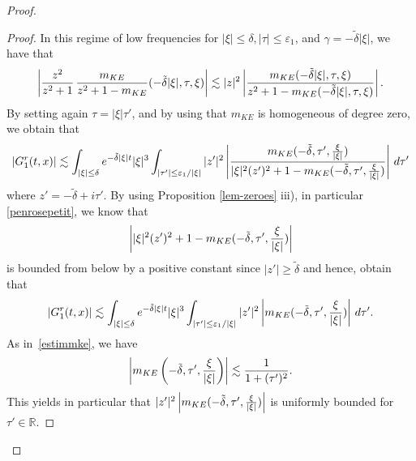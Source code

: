 \documentclass[11pt]{amsart}
\numberwithin{equation}{section}
\newcommand{\eps}{\varepsilon}
\begin{document}
\begin{proof}
   
   \begin{proof}
    In this regime of low frequencies for $ |\xi| \leq \delta, | \tau | \leq \eps_{1}$, and $\gamma= -\tilde \delta |\xi|$, we have  that
     $$\left| { z^2 \over z^2 + 1} \, { m_{KE} \over z^2 + 1 - m_{KE}}(- \tilde \delta | \xi|, \tau,  \xi) \right|
      \lesssim |z|^2  \left | {m_{KE}  (- \tilde \delta | \xi|, \tau , \xi) \over z^2 + 1 - m_{KE}(  -\tilde \delta | \xi|, \tau,  \xi)} \right| .$$
   By setting again $\tau = |\xi| \tau'$, and by using  that $m_{KE}$ is homogeneous of degree zero,  we obtain that
   $$ |G^r_{1}(t,x)| \lesssim   \int_{| \xi | \leq \delta}  e^{ - \tilde \delta | \xi | t} |\xi|^3   \int_{|\tau' | \leq \eps_{1}/|\xi|} 
    |z'|^2  \left| {m_{KE}  ( - \tilde \delta, \tau' , {\xi \over |\xi|}) \over  |\xi|^2 (z')^2  +  1 - m_{KE}(  -\tilde \delta , \tau ',  {\xi \over |\xi|})}  \right|\, d\tau'$$
    where $z' = -\tilde \delta + i \tau'.$
By using Proposition \ref{lem-zeroes} iii), in particular \eqref{penrosepetit}, we know that
$$ \left| |\xi|^2 (z')^2  +  1 - m_{KE}(  -\tilde \delta , \tau ',  {\xi \over |\xi|}) \right|$$
 is bounded from below by a positive constant  since $|z'| \geq  \tilde \delta$
and hence, obtain that
$$ |G^r_{1}(t,x)| \lesssim   \int_{| \xi | \leq \delta}  e^{ - \tilde \delta | \xi | t} |\xi|^3   \int_{|\tau' | \leq \eps_{1}/|\xi|} 
   |z'|^2  \left| m_{KE}  ( - \tilde \delta, \tau' , {\xi \over |\xi|})   \right|\, d\tau'.$$
  As in~\eqref{estimmke}, we have
   $$  \left|m_{KE}  \left( - \tilde \delta, \tau' , {\xi \over |\xi|} \right) \right|\lesssim { 1 \over 1+ (\tau')^2}.$$
   This yields in particular that 
   $ |z'|^2  \left| m_{KE}  ( - \tilde \delta, \tau' , {\xi \over |\xi|})   \right|$
    is uniformly bounded for $\tau' \in \mathbb{R}.$

\end{proof}
\end{proof}
\end{document}
